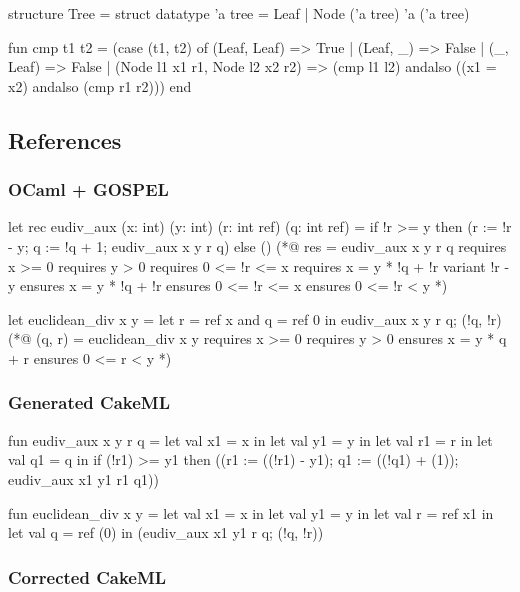 \begin{cakeml}
structure Tree = struct
  datatype 'a tree = Leaf | Node ('a tree) 'a ('a tree)

  fun cmp t1 t2 =
  (case (t1, t2) of
    (Leaf, Leaf) => True
  | (Leaf, _) => False
  | (_, Leaf) => False
  | (Node l1 x1 r1, Node l2 x2 r2) =>
      (cmp l1 l2) andalso ((x1 = x2) andalso (cmp r1 r2)))
end
\end{cakeml}

\newpage

\subsection{References}
\label{subsec:References}

\subsubsection*{OCaml + GOSPEL}

\begin{gospell}
let rec eudiv_aux (x: int) (y: int) (r: int ref) (q: int ref) =
  if !r >= y then (r := !r - y; q := !q + 1; eudiv_aux x y r q)
  else ()
(*@ res = eudiv_aux x y r q
    requires x >= 0
    requires y > 0
    requires 0 <= !r <= x
    requires x = y * !q + !r
    variant !r - y
    ensures x = y * !q + !r
    ensures 0 <= !r <= x
    ensures 0 <= !r < y *)

let euclidean_div x y =
    let r = ref x and q = ref 0 in 
  eudiv_aux x y r q;
  (!q, !r)
(*@ (q, r) = euclidean_div x y
    requires x >= 0
    requires y > 0
    ensures x = y * q + r
    ensures 0 <= r < y *)
\end{gospell}

\subsubsection*{Generated CakeML}

\begin{cakeml}
fun eudiv_aux x y r q = let val x1 = x in
  let val y1 = y in
  let val r1 = r in
  let val q1 = q in
  if (!r1) >= y1
  then ((r1 := ((!r1) - y1); q1 := ((!q1) + (1)); eudiv_aux x1 y1 r1 q1))

fun euclidean_div x y =
  let val x1 = x in
  let val y1 = y in
  let val r = ref x1 in
  let val q = ref (0) in (eudiv_aux x1 y1 r q; (!q, !r))
\end{cakeml}

\newpage

\subsubsection*{Corrected CakeML}

